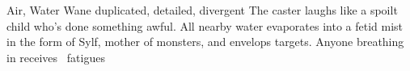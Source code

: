   {Air, Water}%
  {Wane}%
  {duplicated, detailed, divergent}%
  {}%
  {
    The caster laughs like a spoilt child who's done something awful.
    All nearby water evaporates into a fetid mist in the form of Sylf, mother of monsters, and envelops  targets.
    Anyone breathing in receives \showDam~\glspl{fatigue}}%
  {}
